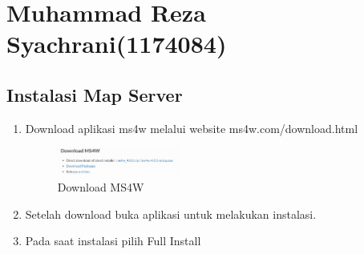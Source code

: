 \section{Muhammad Reza Syachrani(1174084)}
\subsection{Instalasi Map Server}
\begin{enumerate}
    \item Download aplikasi ms4w melalui website ms4w.com/download.html
    \hfill\break
    \begin{figure}[H]
		\includegraphics[width=4cm]{figures/tugas4/1174084/1.png}
		\centering
		\caption{Download MS4W}
    \end{figure}
    \hfill\break

    \item Setelah download buka aplikasi untuk melakukan instalasi.
    \item Pada saat instalasi pilih Full Install
\end{enumerate}

